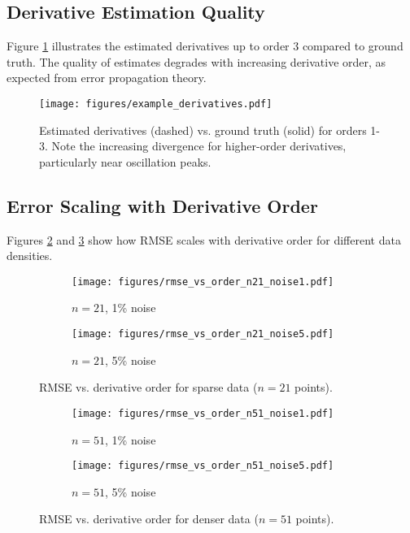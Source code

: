 \documentclass[11pt,a4paper]{article}
\begin{document}
\subsection{Derivative Estimation Quality}

Figure \ref{fig:example_derivatives} illustrates the estimated derivatives up to order 3 compared to ground truth. The quality of estimates degrades with increasing derivative order, as expected from error propagation theory.

\begin{figure}[H]
\centering
\texttt{[image: figures/example\_derivatives.pdf]}
\caption{Estimated derivatives (dashed) vs. ground truth (solid) for orders 1-3. Note the increasing divergence for higher-order derivatives, particularly near oscillation peaks.}
\label{fig:example_derivatives}
\end{figure}

\subsection{Error Scaling with Derivative Order}

Figures \ref{fig:rmse_vs_order_n21} and \ref{fig:rmse_vs_order_n51} show how RMSE scales with derivative order for different data densities.

\begin{figure}[H]
\centering
\begin{subfigure}{0.48\textwidth}
    \texttt{[image: figures/rmse\_vs\_order\_n21\_noise1.pdf]}
    \caption{$n=21$, 1\% noise}
\end{subfigure}
\hfill
\begin{subfigure}{0.48\textwidth}
    \texttt{[image: figures/rmse\_vs\_order\_n21\_noise5.pdf]}
    \caption{$n=21$, 5\% noise}
\end{subfigure}
\caption{RMSE vs. derivative order for sparse data ($n=21$ points).}
\label{fig:rmse_vs_order_n21}
\end{figure}

\begin{figure}[H]
\centering
\begin{subfigure}{0.48\textwidth}
    \texttt{[image: figures/rmse\_vs\_order\_n51\_noise1.pdf]}
    \caption{$n=51$, 1\% noise}
\end{subfigure}
\hfill
\begin{subfigure}{0.48\textwidth}
    \texttt{[image: figures/rmse\_vs\_order\_n51\_noise5.pdf]}
    \caption{$n=51$, 5\% noise}
\end{subfigure}
\caption{RMSE vs. derivative order for denser data ($n=51$ points).}
\label{fig:rmse_vs_order_n51}
\end{figure}
\end{document}
